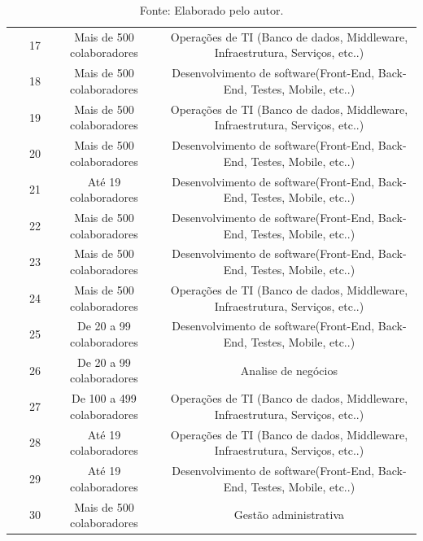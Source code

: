 \documentclass[twoside,english,brazilian]{UNISINOSartigo}
\newcommand{\source}[1]{\caption*{Fonte: {#1}} }
\begin{document}
\begin{table}[h]
\begin{tabularx}{\columnwidth}{cccc}
~ & 17 & Mais de 500 colaboradores & Operações de TI (Banco de dados, Middleware, Infraestrutura, Serviços, etc..) \\
~ & 18 & Mais de 500 colaboradores & Desenvolvimento de software(Front-End, Back-End, Testes, Mobile, etc..) \\
~ & 19 & Mais de 500 colaboradores & Operações de TI (Banco de dados, Middleware, Infraestrutura, Serviços, etc..) \\
~ & 20 & Mais de 500 colaboradores & Desenvolvimento de software(Front-End, Back-End, Testes, Mobile, etc..) \\
~ & 21 & Até 19 colaboradores & Desenvolvimento de software(Front-End, Back-End, Testes, Mobile, etc..) \\
~ & 22 & Mais de 500 colaboradores & Desenvolvimento de software(Front-End, Back-End, Testes, Mobile, etc..) \\
~ & 23 & Mais de 500 colaboradores & Desenvolvimento de software(Front-End, Back-End, Testes, Mobile, etc..) \\
~ & 24 & Mais de 500 colaboradores & Operações de TI (Banco de dados, Middleware, Infraestrutura, Serviços, etc..) \\
~ & 25 & De 20 a 99 colaboradores & Desenvolvimento de software(Front-End, Back-End, Testes, Mobile, etc..) \\
~ & 26 & De 20 a 99 colaboradores & Analise de negócios \\
~ & 27 & De 100 a 499 colaboradores & Operações de TI (Banco de dados, Middleware, Infraestrutura, Serviços, etc..) \\
~ & 28 & Até 19 colaboradores & Operações de TI (Banco de dados, Middleware, Infraestrutura, Serviços, etc..) \\
~ & 29 & Até 19 colaboradores & Desenvolvimento de software(Front-End, Back-End, Testes, Mobile, etc..) \\
~ & 30 & Mais de 500 colaboradores & Gestão administrativa \\
    
    \end{tabularx}
    \source{Elaborado pelo autor.}
\end{table}
\end{document}
